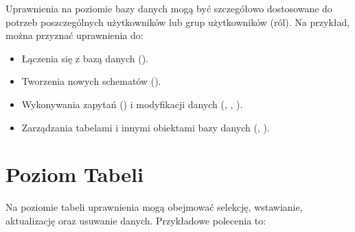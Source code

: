 \documentclass[letterpaper,10pt,polish]{sphinxmanual}
\begin{document}
\begin{sphinxVerbatim}[commandchars=\\\{\}]
       
      
\end{sphinxVerbatim}

\sphinxAtStartPar
Uprawnienia na poziomie bazy danych mogą być szczegółowo dostosowane do
potrzeb poszczególnych użytkowników lub grup użytkowników (ról). Na
przykład, można przyznać uprawnienia do:
\begin{itemize}
\item {} 
\sphinxAtStartPar
Łączenia się z bazą danych ().

\item {} 
\sphinxAtStartPar
Tworzenia nowych schematów ().

\item {} 
\sphinxAtStartPar
Wykonywania zapytań () i modyfikacji danych (,
, ).

\item {} 
\sphinxAtStartPar
Zarządzania tabelami i innymi obiektami bazy danych (,
).

\end{itemize}


\section{Poziom Tabeli}
\label{\detokenize{sprawozdanie/source/rozdzialy/rozdzial2:poziom-tabeli}}
\sphinxAtStartPar
Na poziomie tabeli uprawnienia mogą obejmować selekcję, wstawianie,
aktualizację oraz usuwanie danych. Przykładowe polecenia to:

\begin{sphinxVerbatim}[commandchars=\\\{\}]
       
      
\end{sphinxVerbatim}
\end{document}
